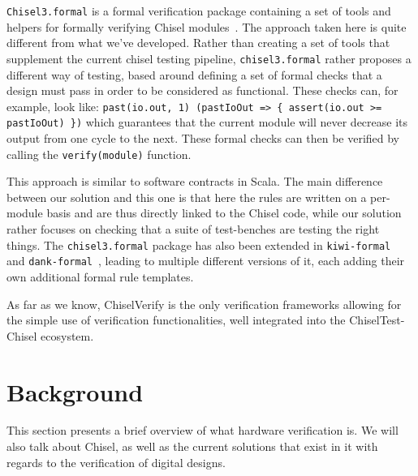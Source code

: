 \documentclass[conference]{IEEEtran}
\begin{document}
\texttt{Chisel3.formal}  is a formal verification package containing a set of tools and helpers for formally verifying Chisel modules~\cite{chisel:formal}. The approach taken here is quite different from what we've developed. Rather than creating a set of tools that supplement the current chisel testing pipeline, \texttt{chisel3.formal} rather proposes a different way of testing, based around defining a set of formal checks that a design must pass in order to be considered as functional. These checks can, for example, look like: \texttt{past(io.out, 1) (pastIoOut => \{ assert(io.out >= pastIoOut) \})} which guarantees that the current module will never decrease its output from one cycle to the next. These formal checks can then be verified by calling the \texttt{verify(module)} function. 

This approach is similar to software contracts in Scala. The main difference between our solution and this one is that here the rules are written on a per-module basis and are thus directly linked to the Chisel code, while our solution rather focuses on checking that a suite of test-benches are testing the right things. The \texttt{chisel3.formal} package has also been extended in \texttt{kiwi-formal}~\cite{chisel:kiwi-formal} and \texttt{dank-formal}~\cite{chisel:dank-formal}, leading to multiple different versions of it, each adding their own additional formal rule templates. 

As far as we know, ChiselVerify is the only verification frameworks allowing for the simple use of verification functionalities, well integrated into the ChiselTest-Chisel ecosystem.

\section{Background}
\label{sec:background}

This section presents a brief overview of what hardware verification is. We will also talk about Chisel, as well as the current solutions that exist in it with regards to the verification of digital designs.
\end{document}
